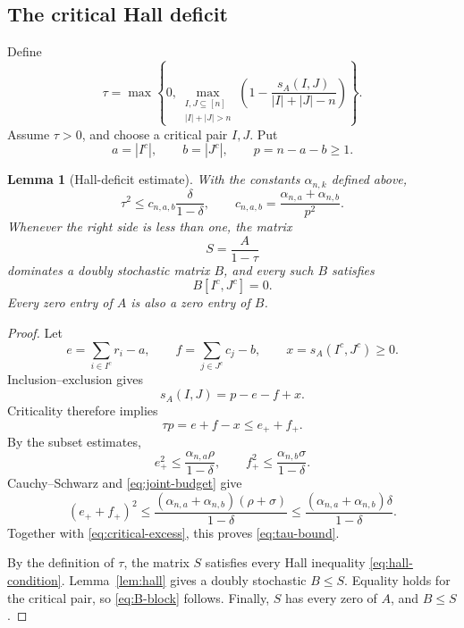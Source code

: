 \documentclass[11pt,a4paper]{article}
\numberwithin{equation}{section}
\newtheorem{lemma}[theorem]{Lemma}
\theoremstyle{definition}
\newcommand{\1}{\mathbf{1}}
\begin{document}
\subsection{The critical Hall deficit}

Define
\begin{equation}\label{eq:tau}
 \tau=
 \max\left\{
 0,
 \max_{\substack{I,J\subseteq[n]\\|I|+|J|>n}}
 \left(
 1-\frac{s_A(I,J)}{|I|+|J|-n}
 \right)
 \right\}.
\end{equation}
Assume $\tau>0$, and choose a critical pair $I,J$.  Put
\begin{equation}\label{eq:abp}
 a=|I^c|,
 \qquad
 b=|J^c|,
 \qquad
 p=n-a-b\ge1.
\end{equation}

\begin{lemma}[Hall-deficit estimate]\label{lem:hall-deficit}
With the constants $\alpha_{n,k}$ defined above,
\begin{equation}\label{eq:tau-bound}
 \tau^2\le c_{n,a,b}\frac{\delta}{1-\delta},
 \qquad
 c_{n,a,b}=
 \frac{\alpha_{n,a}+\alpha_{n,b}}{p^2}.
\end{equation}
Whenever the right side is less than one, the matrix
\begin{equation}\label{eq:S-dilation}
 S=\frac{A}{1-\tau}
\end{equation}
dominates a doubly stochastic matrix $B$, and every such $B$ satisfies
\begin{equation}\label{eq:B-block}
 B[I^c,J^c]=0.
\end{equation}
Every zero entry of $A$ is also a zero entry of $B$.
\end{lemma}

\begin{proof}
Let
\[
 e=\sum_{i\in I^c}r_i-a,
 \qquad
 f=\sum_{j\in J^c}c_j-b,
 \qquad
 x=s_A(I^c,J^c)\ge0.
\]
Inclusion--exclusion gives
\[
 s_A(I,J)=p-e-f+x.
\]
Criticality therefore implies
\begin{equation}\label{eq:critical-excess}
 \tau p=e+f-x\le e_++f_+.
\end{equation}
By the subset estimates,
\[
 e_+^2\le\frac{\alpha_{n,a}\rho}{1-\delta},
 \qquad
 f_+^2\le\frac{\alpha_{n,b}\sigma}{1-\delta}.
\]
Cauchy--Schwarz and \eqref{eq:joint-budget} give
\[
 (e_++f_+)^2
 \le\frac{(\alpha_{n,a}+\alpha_{n,b})(\rho+\sigma)}{1-\delta}
 \le\frac{(\alpha_{n,a}+\alpha_{n,b})\delta}{1-\delta}.
\]
Together with \eqref{eq:critical-excess}, this proves \eqref{eq:tau-bound}.

By the definition of $\tau$, the matrix $S$ satisfies every Hall inequality \eqref{eq:hall-condition}.  Lemma~\ref{lem:hall} gives a doubly stochastic $B\le S$.  Equality holds for the critical pair, so \eqref{eq:B-block} follows.  Finally, $S$ has every zero of $A$, and $B\le S$.
\end{proof}
\end{document}

